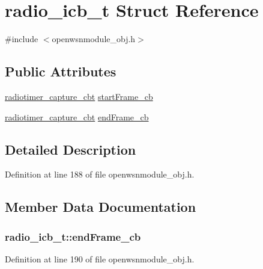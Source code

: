 \hypertarget{structradio__icb__t}{}\section{radio\+\_\+icb\+\_\+t Struct Reference}
\label{structradio__icb__t}


{\ttfamily \#include $<$openwsnmodule\+\_\+obj.\+h$>$}

\subsection*{Public Attributes}
\begin{DoxyCompactItemize}
\item 
\hyperlink{group__radiotimer_gac7da641d0774aa21bfabefd560e42acf}{radiotimer\+\_\+capture\+\_\+cbt} \hyperlink{structradio__icb__t_a6c560d42a7816513fc7dfcb04d5cc13a}{start\+Frame\+\_\+cb}
\item 
\hyperlink{group__radiotimer_gac7da641d0774aa21bfabefd560e42acf}{radiotimer\+\_\+capture\+\_\+cbt} \hyperlink{structradio__icb__t_af8cbe1e9dd115b4fa2af3a70cf61af20}{end\+Frame\+\_\+cb}
\end{DoxyCompactItemize}


\subsection{Detailed Description}


Definition at line 188 of file openwsnmodule\+\_\+obj.\+h.



\subsection{Member Data Documentation}
\subsubsection[{\texorpdfstring{end\+Frame\+\_\+cb}{endFrame_cb}}]{ radio\+\_\+icb\+\_\+t\+::end\+Frame\+\_\+cb}\hypertarget{structradio__icb__t_af8cbe1e9dd115b4fa2af3a70cf61af20}{}\label{structradio__icb__t_af8cbe1e9dd115b4fa2af3a70cf61af20}


Definition at line 190 of file openwsnmodule\+\_\+obj.\+h.


